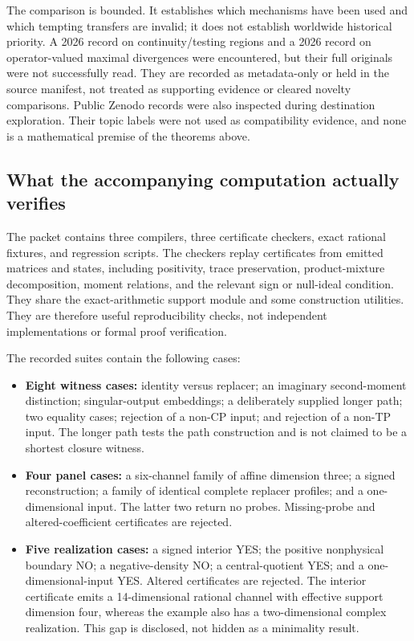\documentclass[11pt,a4paper]{article}
\theoremstyle{definition}\newtheorem{definition}[theorem]{Definition}
\begin{document}
The comparison is bounded. It establishes which mechanisms have been used and which tempting transfers are invalid; it does not establish worldwide historical priority. A 2026 record on continuity/testing regions and a 2026 record on operator-valued maximal divergences were encountered, but their full originals were not successfully read. They are recorded as metadata-only or held in the source manifest, not treated as supporting evidence or cleared novelty comparisons. Public Zenodo records were also inspected during destination exploration. Their topic labels were not used as compatibility evidence, and none is a mathematical premise of the theorems above.

\subsection{What the accompanying computation actually verifies}

The packet contains three compilers, three certificate checkers, exact rational fixtures, and regression scripts. The checkers replay certificates from emitted matrices and states, including positivity, trace preservation, product-mixture decomposition, moment relations, and the relevant sign or null-ideal condition. They share the exact-arithmetic support module and some construction utilities. They are therefore useful reproducibility checks, not independent implementations or formal proof verification.

The recorded suites contain the following cases:
\begin{itemize}
\item \textbf{Eight witness cases:} identity versus replacer; an imaginary second-moment distinction; singular-output embeddings; a deliberately supplied longer path; two equality cases; rejection of a non-CP input; and rejection of a non-TP input. The longer path tests the path construction and is not claimed to be a shortest closure witness.
\item \textbf{Four panel cases:} a six-channel family of affine dimension three; a signed reconstruction; a family of identical complete replacer profiles; and a one-dimensional input. The latter two return no probes. Missing-probe and altered-coefficient certificates are rejected.
\item \textbf{Five realization cases:} a signed interior YES; the positive nonphysical boundary NO; a negative-density NO; a central-quotient YES; and a one-dimensional-input YES. Altered certificates are rejected. The interior certificate emits a 14-dimensional rational channel with effective support dimension four, whereas the example also has a two-dimensional complex realization. This gap is disclosed, not hidden as a minimality result.
\end{itemize}
\end{document}
